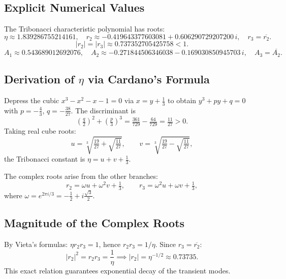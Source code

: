 \documentclass[11pt,a4paper]{article}
\theoremstyle{definition}
\theoremstyle{remark}
\begin{document}
\subsection{Explicit Numerical Values}

The Tribonacci characteristic polynomial has roots:
\[
  \eta\approx1.839286755214161,\quad
  r_2\approx-0.419643377603081+0.606290729207200\,i,\quad r_3=\overline{r_2}.
\]
\[
  |r_2|=|r_3|\approx0.737352705425758<1.
\]
\[
  A_1\approx0.543689012692076,\quad
  A_2\approx-0.271844506346038-0.169030850945703\,i,\quad A_3=\overline{A_2}.
\]

\subsection{Derivation of \texorpdfstring{$\eta$}{eta} via Cardano's Formula}

Depress the cubic $x^3-x^2-x-1=0$ via $x=y+\tfrac{1}{3}$ to obtain $y^3+py+q=0$ with
$p=-\tfrac{4}{3}$, $q=-\tfrac{38}{27}$. The discriminant is
\[
  \left(\tfrac{q}{2}\right)^2+\left(\tfrac{p}{3}\right)^3
  =\tfrac{361}{729}-\tfrac{64}{729}=\tfrac{11}{27}>0.
\]
Taking real cube roots:
\[
  u=\sqrt[3]{\tfrac{19}{27}+\sqrt{\tfrac{11}{27}}},\qquad
  v=\sqrt[3]{\tfrac{19}{27}-\sqrt{\tfrac{11}{27}}},
\]
the Tribonacci constant is $\eta=u+v+\tfrac{1}{3}$.

The complex roots arise from the other branches:
\[
  r_2=\omega u+\omega^2 v+\tfrac{1}{3},\qquad r_3=\omega^2 u+\omega v+\tfrac{1}{3},
\]
where $\omega=e^{2\pi i/3}=-\tfrac{1}{2}+i\tfrac{\sqrt{3}}{2}$.

\subsection{Magnitude of the Complex Roots}

By Vieta's formulas: $\eta r_2r_3=1$, hence $r_2r_3=1/\eta$. Since $r_3=\overline{r_2}$:
\[
  |r_2|^2=r_2r_3=\frac{1}{\eta}\implies|r_2|=\eta^{-1/2}\approx0.73735.
\]
This exact relation guarantees exponential decay of the transient modes.
\end{document}
